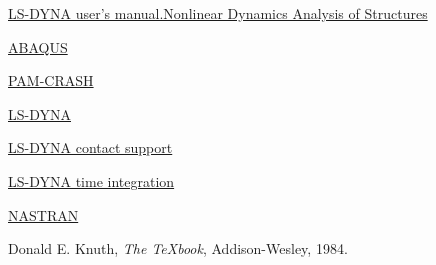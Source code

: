 \documentclass[11pt]{article} %
\begin{document}
\begin{thebibliography}{9}

\href{https://lsdyna.ansys.com/wp-content/uploads/2025/02/ls-dyna_950_manual_s.pdf}{LS-DYNA user's manual.Nonlinear Dynamics Analysis of Structures}

\href{https://discover.3ds.com/de/test-and-validate-your-product-faster-abaqus?utm_medium=cpc&utm_source=google&utm_campaign=202501_glo_sea_de_op51508_labl_brand_eca_all&utm_term=abaqus_T100&utm_content=search&gad_source=1&gad_campaignid=22133132152&gbraid=0AAAAADqOeJQo8cPVO3O8HReFA5xqlsbcV&gclid=Cj0KCQjw8eTFBhCXARIsAIkiuOz0AwZ5HHwXXr4HbZGj1htHy6OLYzP8gmSckCMTtP8vHNiF-u39me0aAgNjEALw_wcB}{ABAQUS}

\href{https://www.esi-group.com/pam-crash}{PAM-CRASH}

\href{https://www.ansys.com/products/structures/ansys-ls-dyna?&utm_campaign=product&utm_medium=paid-search&utm_source=google&utm_content=digital_structures_copr15ls_contact_contact-us_ls-dyna-structures-brand-search_1a_en_global|110161841694|677373363295|&campaignid=7013g000000cXBnAAM&utm_term=ls%20dyna&plid=110161841694&cid=677373363295&gad_source=1&gad_campaignid=11358860077&gbraid=0AAAAAD8uywbwCN-W7N_ML-4prX1aoVBCW&gclid=Cj0KCQjw8eTFBhCXARIsAIkiuOwIqdHLABcWvzB601bvPjLYZ5dMRd0H0hiRBGsB2mdnjAoNHMxrZb0aApFCEALw_wcB}{LS-DYNA}


\href{https://www.dynasupport.com/tutorial/ls-dyna-users-guide/contact-modeling-in-ls-dyna}{LS-DYNA contact support}

\href{https://www.dynasupport.com/tutorial/ls-dyna-users-guide/time-integration}{LS-DYNA time integration}

\href{https://www.autodesk.com/products/nastran}{NASTRAN}

Donald E. Knuth,
\textit{The TeXbook},
Addison-Wesley, 1984.

\end{thebibliography}
\end{document}

